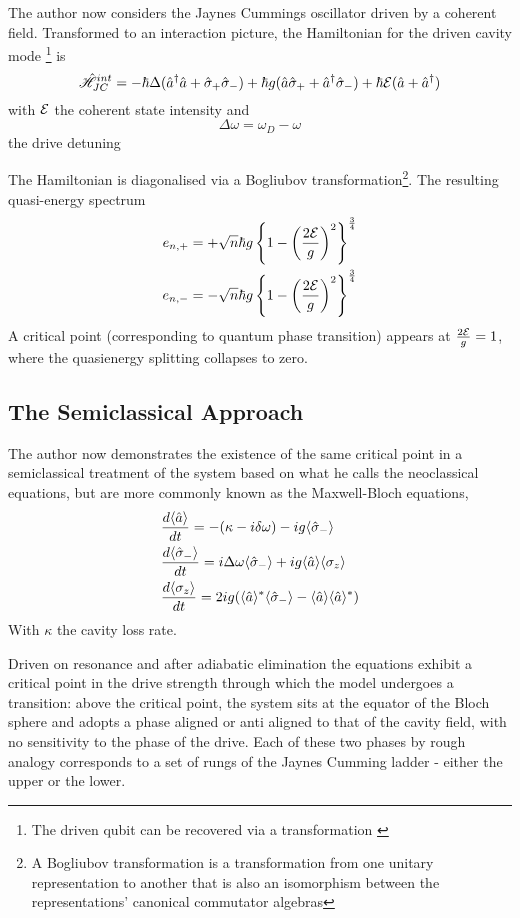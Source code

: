 The author now considers the Jaynes Cummings oscillator driven by a coherent field. Transformed to an interaction picture, the Hamiltonian for the driven cavity mode \footnote{The driven qubit can be recovered via a transformation \autocite{Alsing1999}} is 
\begin{equation}
	\hat{\mathscr{H}}_{JC}^{int} = -\hbar \Delta (\hat{a}^\dagger \hat{a} + \hat{\sigma}_+ \hat{\sigma}_-) + \hbar g(\hat{a} \hat{\sigma}_+ + \hat{a}^\dagger \hat{\sigma}_-) + \hbar \mathcal{E}(\hat{a} + \hat{a}^\dagger)
\end{equation}
with $\mathcal{E}$ the coherent state intensity and
\begin{equation}
	\Delta \omega = \omega_D - \omega
\end{equation}
the drive detuning

The Hamiltonian is diagonalised via a Bogliubov transformation\footnote{A Bogliubov transformation is a transformation from one unitary representation to another that is also an isomorphism between the representations' canonical commutator algebras}. The resulting quasi-energy spectrum
\begin{align}
	e_{n, +} &= + \sqrt{n} \hbar g \left \{1 - \left ({\frac{2\mathcal{E}}{g}} \right )^2 \right \}^{\frac{3}{4}} \\
	e_{n, -} &= - \sqrt{n} \hbar g \left \{1 - \left ({\frac{2\mathcal{E}}{g}} \right )^2 \right \}^{\frac{3}{4}}
\end{align}
A critical point (corresponding to quantum phase transition) appears at $\frac{2\mathcal{E}}{g} = 1$, where the quasienergy splitting collapses to zero.

\subsection{The Semiclassical Approach}

The author now demonstrates the existence of the same critical point in a semiclassical treatment of the system based on what he calls the neoclassical equations, but are more commonly known as the Maxwell-Bloch equations, 
\begin{align}
	&\frac{d \langle \hat{a} \rangle}{dt} = -(\kappa -i \delta \omega)-ig \langle \hat{\sigma}_- \rangle \\
	&\frac{d \langle \hat{\sigma}_- \rangle}{dt} = i \Delta \omega \langle \hat{\sigma}_- \rangle +ig \langle \hat{a} \rangle \langle \sigma_z \rangle \\	
	&\frac{d \langle \sigma_z \rangle}{dt} = 2 i g(\langle \hat{a} \rangle^* \langle \hat{\sigma}_- \rangle -\langle \hat{a} \rangle \langle \hat{a} \rangle^*)
\end{align}
With $\kappa$ the cavity loss rate.

Driven on resonance and after adiabatic elimination the equations exhibit a critical point in the drive strength through which the model undergoes a transition: above the critical point, the system sits at the equator of the Bloch sphere and adopts a phase aligned or anti aligned to that of the cavity field, with no sensitivity to the phase of the drive. Each of these two phases by rough analogy corresponds to a set of rungs of the Jaynes Cumming ladder - either the upper or the lower. 

